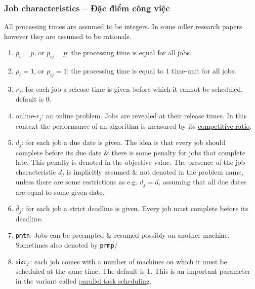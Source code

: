 \documentclass{article}
\begin{document}

\subsubsection{Job characteristics -- Đặc điểm công việc}
All processing times are assumed to be integers. In some odler research papers however they are assumed to be rationals.
\begin{enumerate}
	\item $p_i = p$, or $p_{ij} = p$: the processing time is equal for all jobs.
	\item $p_i = 1$, or $p_{ij} = 1$: the processing time is equal to $1$ time-unit for all jobs.
	\item $r_j$: for each job a release time is given before which it cannot be scheduled, default is 0.
	\item online-$r_j$: an online problem. Jobs are revealed at their release times. In this context the performance of an algorithm is measured by its \href{https://en.wikipedia.org/wiki/Competitive_analysis_(online_algorithm)}{competitive ratio}.
	\item $d_j$: for each job a due date is given. The idea is that every job should complete before its due date \& there is some penalty for jobs that complete late. This penalty is denoted in the objective value. The presence of the job characteristic $d_j$ is implicitly assumed \& not denoted in the problem name, unless there are some restrictions as e.g. $d_j = d$, assuming that all due dates are equal to some given date.
	\item $\bar{d}_j$: for each job a strict deadline is given. Every job must complete before its deadline.
	\item {\tt pmtn}: Jobs can be preempted \& resumed possibly on another machine. Sometimes also denoted by {\tt prmp}/
	\item ${\rm size}_j$: each job comes with a number of machines on which it must be scheduled at the same time. The default is 1. This is an important parameter in the variant called \href{https://en.wikipedia.org/wiki/Parallel_task_scheduling}{parallel task scheduling}.
\end{enumerate}
\end{document}
